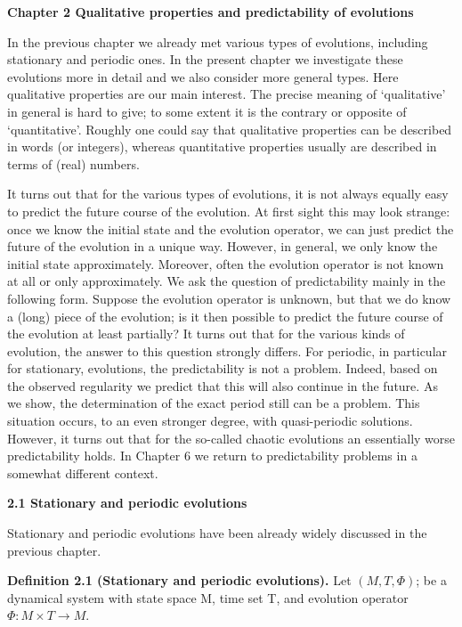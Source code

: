 \documentclass{article}
\begin{document}
\textbf{Chapter 2
Qualitative properties and predictability
of evolutions}

\hfill

In the previous chapter we already met various types of evolutions, including
stationary and periodic ones. In the present chapter we investigate these evolutions
more in detail and we also consider more general types. Here qualitative properties
are our main interest. The precise meaning of ‘qualitative’ in general is hard to give;
to some extent it is the contrary or opposite of ‘quantitative’. Roughly one could say
that qualitative properties can be described in words (or integers), whereas quantitative
properties usually are described in terms of (real) numbers.

\hfill

It turns out that for the various types of evolutions, it is not always equally easy to
predict the future course of the evolution. At first sight this may look strange: once
we know the initial state and the evolution operator, we can just predict the future
of the evolution in a unique way. However, in general, we only know the initial
state approximately. Moreover, often the evolution operator is not known at all or
only approximately. We ask the question of predictability mainly in the following
form. Suppose the evolution operator is unknown, but that we do know a (long)
piece of the evolution; is it then possible to predict the future course of the evolution
at least partially? It turns out that for the various kinds of evolution, the answer to
this question strongly differs. For periodic, in particular for stationary, evolutions,
the predictability is not a problem. Indeed, based on the observed regularity we
predict that this will also continue in the future. As we show, the determination of
the exact period still can be a problem. This situation occurs, to an even stronger
degree, with quasi-periodic solutions. However, it turns out that for the so-called
chaotic evolutions an essentially worse predictability holds. In Chapter 6 we return
to predictability problems in a somewhat different context.

\hfill

\textbf{2.1 Stationary and periodic evolutions}

\hfill

Stationary and periodic evolutions have been already widely discussed in the previous
chapter.

\hfill

\textbf{Definition 2.1 (Stationary and periodic evolutions).} Let $(M, T, \Phi)$; be a dynamical
system with state space M, time set T, and evolution operator $\Phi: M \times T \to M$.
\end{document}

